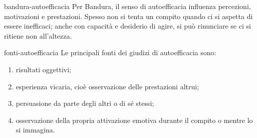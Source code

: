 \documentclass[preview]{standalone}
\begin{document}
\begin{snippet}{bandura-autoefficacia}
    Per Bandura, il senso di autoefficacia influenza percezioni, motivazioni e
    prestazioni. Spesso non si tenta un compito quando ci si aspetta di essere
    inefficaci; anche con capacità e desiderio di agire, si può rinunciare se ci
    si ritiene non all'altezza.
\end{snippet}

\begin{snippet}{fonti-autoefficacia}
    Le principali fonti dei giudizi di autoefficacia sono:
    \begin{enumerate}
        \item risultati oggettivi;
        \item esperienza vicaria, cioè osservazione delle prestazioni altrui;
        \item persuasione da parte degli altri o di sé stessi;
        \item osservazione della propria attivazione emotiva durante il compito
        o mentre lo si immagina.
    \end{enumerate}
\end{snippet}

\end{document}
